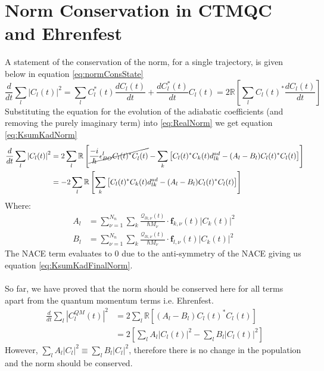 \chapter{Norm Conservation in CTMQC and Ehrenfest}
\label{ap:norm_cons}
A statement of the conservation of the norm, for a single trajectory, is given below in equation \eqref{eq:normConsState}
\begin{equation}
	\frac{d}{dt} \sum_{l} \left\vert C_{l}(t) \right\vert^2 = \sum_{l} C_{l}^{*}(t)\frac{d C_{l}(t)}{dt} + \frac{d C_{l}^{*}(t)}{dt}C_{l}(t)
	\label{eq:normConsState} = 2 \mathbb{R} \left[ \sum_{l} C_{l}(t)^{*} \frac{d C_{l}(t)}{dt} \right]
\end{equation}
Substituting the equation for the evolution of the adiabatic coefficients (and removing the purely imaginary term) into \eqref{eq:RealNorm} we get equation \eqref{eq:KsumKadNorm}
\begin{align}
	\frac{d}{dt} \sum_{l} \left\vert C_{l}(t) \right\vert^2 &= 2 \sum_{l} \mathbb{R} \left[ \cancel{\frac{-i}{\hbar} \epsilon_{BO}^{l} C_l(t)^*C_l^{}(t)}
	- \sum_{k} \left[ C_l(t)^*C_k(t) d_{lk}^{ad} - (A_l - B_{l}) C_l(t)^*C_l(t)  \right] \right]
	\\
	&= -2 \sum_{l} \mathbb{R} \left[ \sum_{k} \left[ C_l(t)^*C_k(t) d_{lk}^{ad} - (A_l - B_{l}) C_l(t)^*C_l(t)  \right] \right]
	\label{eq:KsumKadNorm}
\end{align}
Where:
\begin{align}
	A_{l} &= \sum_{\nu = 1}^{N_n} \sum_{k} \frac{\mathcal{Q}_{lk, \nu}(t)}{\hbar M_\nu}\cdot \mathbf{f}_{k, \nu}(t) \vert C_k(t) \vert^2 \ \\
	B_{l} &= \sum_{\nu = 1}^{N_n} \sum_{k} \frac{\mathcal{Q}_{lk, \nu}(t)}{\hbar M_\nu}\cdot \mathbf{f}_{l, \nu}(t) \vert C_{k}(t)\vert^2
\end{align}
The NACE term evaluates to 0 due to the anti-symmetry of the NACE giving us equation \eqref{eq:KsumKadFinalNorm}. 
\\\\
So far, we have proved that the norm should be conserved here for all terms apart from the quantum momentum terms i.e. Ehrenfest.
\begin{align}
	\frac{d}{dt} \sum_{l} \left\vert C^{QM}_{l}(t) \right\vert^2 &= 2 \sum_{l} \mathbb{R} \left[ (A_l - B_{l}) C_l(t)^*C_l(t)  \right] \\
	&= 2 \left[ \sum_l A_l |C_{l}(t)|^2 - \sum_{l} B_{l} \vert C_{l}(t) \vert^2 \right]
	\label{eq:KsumKadFinalNorm}
\end{align}
However, $\sum_{l}A_l |C_{l}|^2 \equiv \sum_{l} B_{l} |C_{l}|^2$, therefore there is no change in the population and the norm should be conserved.
